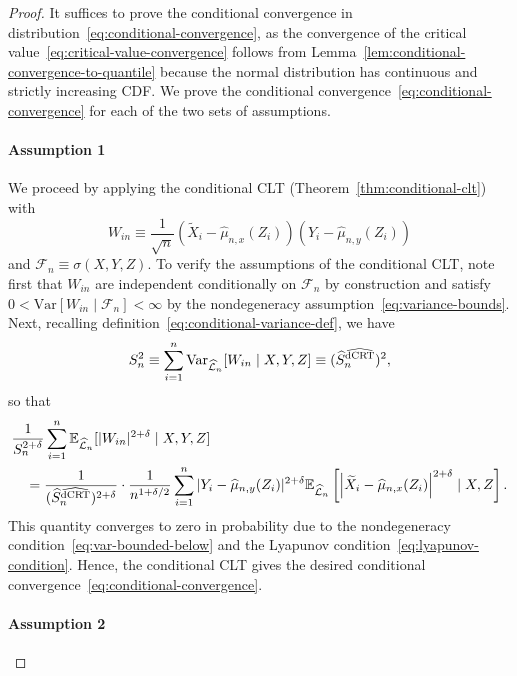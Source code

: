 \documentclass[aos]{imsart}
\theoremstyle{plain}
\theoremstyle{remark}
\newcommand{\E}{\mathbb E}								%
\newcommand{\V}{\mathrm{Var}}							%
\newcommand{\srx}{X}									%
\newcommand{\srz}{Z}									%
\newcommand{\srxk}{\widetilde X}						%
\newcommand{\sry}{Y}									%
\newcommand{\lawhat}{\widehat{\mathcal L}}				%
\newcommand{\dCRThat}{\widehat{\textnormal{dCRT}}}		%
\begin{document}
\begin{proof}

It suffices to prove the conditional convergence in distribution~\eqref{eq:conditional-convergence}, as the convergence of the critical value~\eqref{eq:critical-value-convergence} follows from Lemma~\ref{lem:conditional-convergence-to-quantile} because the normal distribution has continuous and strictly increasing CDF. We prove the conditional convergence~\eqref{eq:conditional-convergence} for each of the two sets of assumptions.

\paragraph*{Assumption 1}

We proceed by applying the conditional CLT (Theorem~\ref{thm:conditional-clt}) with 
\begin{equation}
W_{in} \equiv \frac{1}{\sqrt{n}}(\srxk_i - \widehat \mu_{n,x}(\srz_i))(\sry_i - \widehat \mu_{n,y}(\srz_i))
\end{equation}
and $\mathcal F_n \equiv \sigma(\srx, \sry, \srz)$. To verify the assumptions of the conditional CLT, note first that $W_{in}$ are independent conditionally on $\mathcal F_n$ by construction and satisfy $0 < \V[W_{in} \mid \mathcal F_n] < \infty$ by the nondegeneracy assumption~\eqref{eq:variance-bounds}. Next, recalling definition~\eqref{eq:conditional-variance-def}, we have
\begin{equation*}
S^2_n \equiv \sum_{i = 1}^n \V_{\lawhat_n}[W_{in}\mid \srx,\sry,\srz] \equiv (\widehat S_n^{\dCRThat})^2,
\end{equation*}
so that
\begin{align*}
		&\frac{1}{S_n^{2+\delta}} \sum_{i = 1}^n \E_{\lawhat_n}[|W_{in}|^{2+\delta} \mid \srx,\sry,\srz] \\
		&\quad= \frac{1}{(\widehat S_n^{\dCRThat})^{2+\delta}} \cdot \frac{1}{n^{1+\delta/2}} \sum_{i=1}^n |\sry_i-\widehat\mu_{n,y}(\srz_i)|^{2+\delta}\E_{\lawhat_n}\left[\left|\srxk_i-\widehat\mu_{n,x}(\srz_i)\right|^{2+\delta}\mid \srx,\srz\right].
\end{align*}
This quantity converges to zero in probability due to the nondegeneracy condition~\eqref{eq:var-bounded-below} and the Lyapunov condition~\eqref{eq:lyapunov-condition}. Hence, the conditional CLT gives the desired conditional convergence~\eqref{eq:conditional-convergence}.
 
 \paragraph*{Assumption 2}


\end{proof}
\end{document}
